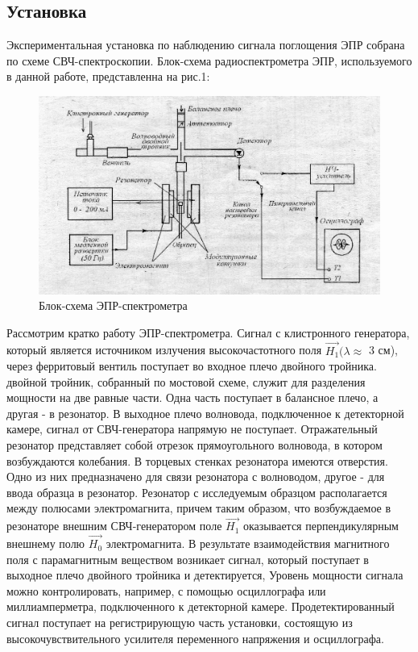 \subsection{Установка}
Экспериментальная установка по наблюдению сигнала поглощения ЭПР собрана по схеме СВЧ-спектроскопии. Блок-схема радиоспектрометра ЭПР, используемого в данной работе, представленна на рис.1:
\begin{figure}[h!]
	\centering
	\includegraphics[width=\linewidth]{fig/Sh.jpg}
	\caption{Блок-схема ЭПР-спектрометра}
	\label{fig:1}
\end{figure}

Рассмотрим кратко работу ЭПР-спектрометра. Сигнал с клистронного генератора, который является источником излучения высокочастотного поля $\vec{H_1}(\lambda \approx$ 3 см), через ферритовый вентиль поступает во входное плечо двойного тройника. двойной тройник, собранный по мостовой схеме, служит для разделения мощности на две равные части. Одна часть поступает в балансное плечо, а другая - в резонатор. В выходное плечо волновода, подключенное к детекторной камере, сигнал от СВЧ-генератора напрямую не поступает. Отражательный резонатор представляет собой отрезок прямоугольного волновода, в котором возбуждаются колебания. В торцевых стенках резонатора имеются отверстия. Одно из них предназначено для связи резонатора с волноводом, другое - для ввода образца в резонатор. Резонатор с исследуемым образцом располагается между полюсами электромагнита, причем таким образом, что возбуждаемое в резонаторе внешним СВЧ-генератором поле $\vec{H_1}$ оказывается перпендикулярным внешнему полю $\vec{H_0}$ электромагнита. В результате взаимодействия магнитного поля с парамагнитным веществом возникает сигнал, который поступает в выходное плечо двойного тройника и детектируется, Уровень мощности сигнала можно контролировать, например, с помощью осциллографа или миллиамперметра, подключенного к детекторной камере. Продетектированный сигнал поступает на регистрирующую часть установки, состоящую из высокочувствительного усилителя переменного напряжения и осциллографа. 


